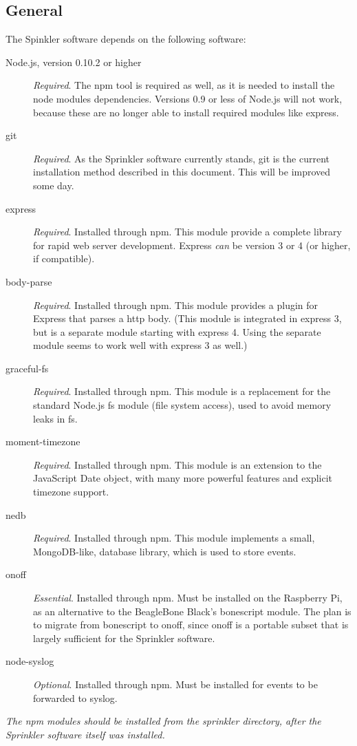 \documentclass[11pt]{book}
\begin{document}
\subsection{General}
The Spinkler software depends on the following software:
\begin{description}
\item[Node.js, version 0.10.2 or higher] \emph{Required}. The npm tool is required as well, as it is needed to install the node modules dependencies. Versions 0.9 or less of Node.js will not work, because these are no longer able to install required modules like express.
\item[git] \emph{Required}. As the Sprinkler software currently stands, git is the current installation method described in this document. This will be improved some day.
\item[express] \emph{Required}. Installed through npm. This module provide a complete library for rapid web server development. Express \emph{can} be version 3 or 4 (or higher, if compatible).
\item[body-parse] \emph{Required}. Installed through npm. This module provides a plugin for Express that parses a http body. (This module is integrated in express 3, but is a separate module starting with express 4. Using the separate module seems to work well with express 3 as well.)
\item[graceful-fs] \emph{Required}. Installed through npm. This module is a replacement for the standard Node.js fs module (file system access), used to avoid memory leaks in fs.
\item[moment-timezone] \emph{Required}. Installed through npm. This module is an extension to the JavaScript Date object, with many more powerful features and explicit timezone support.
\item[nedb] \emph{Required}. Installed through npm. This module implements a small, MongoDB-like, database library, which is used to store events.
\item[onoff] \emph{Essential}. Installed through npm. Must be installed on the Raspberry Pi, as an alternative to the BeagleBone Black's bonescript module. The plan is to migrate from bonescript to onoff, since onoff is a portable subset that is largely sufficient for the Sprinkler software.
\item[node-syslog] \emph{Optional}. Installed through npm. Must be installed for events to be forwarded to syslog. 
\end{description}
\emph{The npm modules should be installed from the sprinkler directory, after the Sprinkler software itself was installed.}
\end{document}
